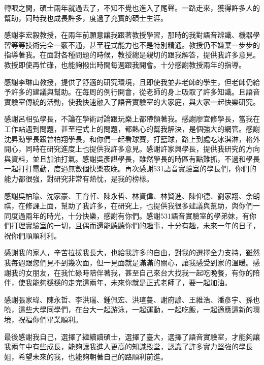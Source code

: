\NTUtitlepage  %

\newpage
\setcounter{page}{1}

\NTUoralpage  %

\mydoublespacing
\begin{acknowledgement} %
轉眼之間，碩士兩年就過去了，不知不覺也進入了尾聲。一路走來，獲得許多人的幫助，同時我也成長許多，度過了充實的碩士生涯。

感謝李宏毅教授，在兩年前願意讓我跟著教授學習，那時的我對語音辨識、機器學習等等技術完全一竅不通，甚至程式能力也不是特別精通。教授仍不嫌棄一步步的指導著我。在面對各種問題的時候，教授總是親切的跟我解答，提供我許多意見。教授即使再忙碌，也能夠撥出時間每週跟我開會。十分感謝教授兩年的指導。

感謝李琳山教授，提供了舒適的研究環境，且即使我並非老師的學生，但老師仍給予許多的建議與幫助。在每周的例行開會，從老師的身上吸取了許多知識。且語音實驗室傳統的活動，使我快速融入了語音實驗室的大家庭，與大家一起快樂研究。

感謝呂相弘學長，不論在學術討論跟玩樂上都帶領著我。感謝廖宜修學長，當我在工作站遇到問題，甚至程式上的問題，都熱心的幫我解決，是個強大的網管。感謝沈昇勳學長跟曾柏翔學長，和你們一起看球賽，打籃球，路上到處吃冰淇淋，格外開心，同時在研究進度上也提供我許多意見。感謝許家興學長，提供我研究的方向與資料，並且加油打氣。感謝吳彥諶學長，雖然學長的時區有點難抓，不過和學長一起打打電動，度過無數個快樂夜晚。再次感謝531語音實驗室的學長們，你們的能力都很強，對研究非常有熱忱，是我的榜樣。

感謝吳柏瑜、沈家豪、王育軒、陳永哲、林資偉、林賢進、陳仰德、劉家翔、余朗祺，在修課上面，幫助了我許多，在研究上，也提供我很多建議與幫助，與你們一同度過兩年的時光，十分快樂，感謝有你們。感謝531語音實驗室的學弟妹，有你們打理實驗室的一切，且偶而還能聽聽你們的趣事，十分有趣，未來一年的日子，祝你們順順利利。

感謝我的家人，辛苦拉拔我長大，也給我許多的自由，對我的選擇全力支持，雖然我每週跟您們見不到幾次面，但一見面就是滿滿的關心，讓我感受到家的溫暖。感謝我的女朋友，在我忙碌時陪伴著我，甚至自己來台大找我一起吃晚餐，有你的陪伴，使我能夠穩穩的走完這兩年，未來你就是正式老師了，要一起加油。

感謝張家瑋、陳永哲、李洪瑞、鍾佩宏、洪瑄蔓、謝府諺、王維浩、潘彥宇、孫也喨，這些大學同學們，在台大一起游泳，一起運動，一起吃飯，一起適應這新的環境，祝福你們畢業順利。

最後感謝我自己，選擇了繼續讀碩士，選擇了臺大，選擇了語音實驗室，才能夠讓我兩年中有些成長，能夠讓我進入更高的知識殿堂，認識了許多實力堅強的學長姐，希望未來的我，也能夠朝著自己的路順利前進。
\end{acknowledgement}

